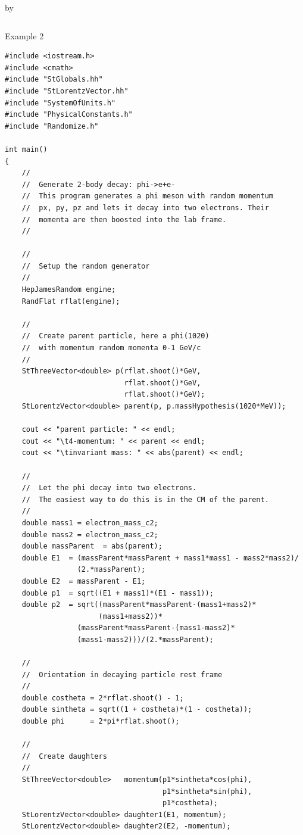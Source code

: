 \documentclass[twoside]{article}
\newcommand{\entrylabel}[1]{\mbox{\textbf{{#1}}}\hfil}%
\newenvironment{entry}
{\begin{list}{}%
    {\renewcommand{\makelabel}{\entrylabel}%
     \setlength{\labelwidth}{90pt}%
     \setlength{\leftmargin}{\labelwidth}
     \advance\leftmargin by \labelsep%
      }%
    }%
  {\end{list}}
\newcommand{\Entrylabel}[1]%
{\raisebox{0pt}[1ex][0pt]{\makebox[\labelwidth][l]%
    {\parbox[t]{\labelwidth}{\hspace{0pt}\textbf{{#1}}}}}}
\newenvironment{Entry}%
{\renewcommand{\entrylabel}{\Entrylabel}\begin{entry}}%
  {\end{entry}}
\begin{document}
\begin{Entry}
{\begin{verbatim}
\end{verbatim}
} %

\item[Example 2]
{\footnotesize
\begin{verbatim}
#include <iostream.h>
#include <cmath>
#include "StGlobals.hh"
#include "StLorentzVector.hh"
#include "SystemOfUnits.h"
#include "PhysicalConstants.h"
#include "Randomize.h"

int main() 
{    
    //
    //  Generate 2-body decay: phi->e+e-
    //  This program generates a phi meson with random momentum
    //  px, py, pz and lets it decay into two electrons. Their
    //  momenta are then boosted into the lab frame.
    //

    //
    //  Setup the random generator
    //
    HepJamesRandom engine;
    RandFlat rflat(engine);

    //
    //  Create parent particle, here a phi(1020)
    //  with momentum random momenta 0-1 GeV/c
    //
    StThreeVector<double> p(rflat.shoot()*GeV,
                            rflat.shoot()*GeV,
                            rflat.shoot()*GeV);
    StLorentzVector<double> parent(p, p.massHypothesis(1020*MeV));

    cout << "parent particle: " << endl;
    cout << "\t4-momentum: " << parent << endl;
    cout << "\tinvariant mass: " << abs(parent) << endl;
    
    //
    //  Let the phi decay into two electrons.
    //  The easiest way to do this is in the CM of the parent.
    //
    double mass1 = electron_mass_c2;
    double mass2 = electron_mass_c2;
    double massParent  = abs(parent);
    double E1  = (massParent*massParent + mass1*mass1 - mass2*mass2)/
                 (2.*massParent);
    double E2  = massParent - E1;
    double p1  = sqrt((E1 + mass1)*(E1 - mass1));
    double p2  = sqrt((massParent*massParent-(mass1+mass2)*
                      (mass1+mass2))*
                 (massParent*massParent-(mass1-mass2)*
                 (mass1-mass2)))/(2.*massParent);

    //
    //  Orientation in decaying particle rest frame
    //
    double costheta = 2*rflat.shoot() - 1;
    double sintheta = sqrt((1 + costheta)*(1 - costheta));
    double phi      = 2*pi*rflat.shoot();

    //
    //  Create daughters
    //
    StThreeVector<double>   momentum(p1*sintheta*cos(phi),
                                     p1*sintheta*sin(phi),
                                     p1*costheta);
    StLorentzVector<double> daughter1(E1, momentum);
    StLorentzVector<double> daughter2(E2, -momentum);
    

\end{verbatim}}
\end{Entry}
\end{document}
